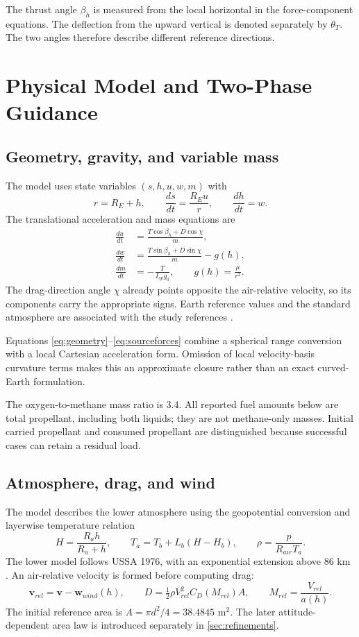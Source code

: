 \documentclass[11pt,a4paper]{article}
\newcommand{\vect}[1]{\bm{#1}}
\begin{document}
The thrust angle $\beta_h$ is measured from the local horizontal in the force-component equations. The deflection from the upward vertical is denoted separately by $\theta_T$. The two angles therefore describe different reference directions.

\section{Physical Model and Two-Phase Guidance}
\subsection{Geometry, gravity, and variable mass}
The model uses state variables $(s,h,u,w,m)$ with
\begin{equation}
 r=R_E+h,\qquad \frac{ds}{dt}=\frac{R_Eu}{r},\qquad \frac{dh}{dt}=w.
\label{eq:geometry}
\end{equation}
The translational acceleration and mass equations are
\begin{align}
 \frac{du}{dt}&=\frac{T\cos\beta_h+D\cos\chi}{m},\\
 \frac{dw}{dt}&=\frac{T\sin\beta_h+D\sin\chi}{m}-g(h),\\
 \frac{dm}{dt}&=-\frac{T}{I_{sp}g_0},\qquad
 g(h)=\frac{\mu}{r^2}.
\label{eq:sourceforces}
\end{align}
The drag-direction angle $\chi$ already points opposite the air-relative velocity, so its components carry the appropriate signs. Earth reference values and the standard atmosphere are associated with the study references \cite{ussa,earth,iers}.

Equations \eqref{eq:geometry}--\eqref{eq:sourceforces} combine a spherical range conversion with a local Cartesian acceleration form. Omission of local velocity-basis curvature terms makes this an approximate closure rather than an exact curved-Earth formulation.

The oxygen-to-methane mass ratio is 3.4. All reported fuel amounts below are total propellant, including both liquids; they are not methane-only masses. Initial carried propellant and consumed propellant are distinguished because successful cases can retain a residual load.

\subsection{Atmosphere, drag, and wind}
The model describes the lower atmosphere using the geopotential conversion and layerwise temperature relation
\begin{equation}
 H=\frac{R_ah}{R_a+h},\qquad
 T_a=T_b+L_b(H-H_b),\qquad \rho=\frac{p}{R_{air}T_a}.
\label{eq:atmo}
\end{equation}
The lower model follows USSA 1976, with an exponential extension above 86 km \cite{ussa}. An air-relative velocity is formed before computing drag:
\begin{equation}
 \vect v_{rel}=\vect v-\vect w_{wind}(h),\qquad
 D=\tfrac12\rho V_{rel}^2C_D(M_{rel})A,\qquad
 M_{rel}=\frac{V_{rel}}{a(h)}.
\end{equation}
The initial reference area is $A=\pi d^2/4=38.4845$ m$^2$. The later attitude-dependent area law is introduced separately in \cref{sec:refinements}.
\end{document}
